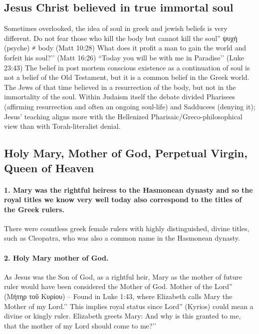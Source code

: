 \subsection{Jesus Christ believed in true immortal soul}\label{subsec:jesus-christ-believed-in-true-immortal-soul}
Sometimes overlooked, the idea of soul in greek and jewish beliefs is very different.
Do not fear those who kill the body but cannot kill the soul'' ψυχή (psyche) ≠ body (Matt 10:28) What does it profit a man to gain the world and forfeit his soul?’’ (Matt 16:26) ``Today you will be with me in Paradise’’ (Luke 23:43)
The belief in post mortem conscious existence as a continuation of soul is not a belief of the Old Testament, but it is a common belief in the Greek world.
The Jews of that time believed in a resurrection of the body, but not in the immortality of the soul.
Within Judaism itself the debate divided Pharisees (affirming resurrection and often an ongoing soul-life) and Sadducees (denying it); Jesus’ teaching aligns more with the Hellenized Pharisaic/Greco-philosophical view than with Torah-literalist denial.

\subsection{Holy Mary, Mother of God, Perpetual Virgin, Queen of Heaven}\label{subsec:holy-mary-mother-of-god-perpetual-virgin-queen-of-heaven}
\paragraph{1.
Mary was the rightful heiress to the Hasmonean dynasty and so the royal titles we know very well today also correspond to the titles of the Greek rulers.}\label{par:mary-was-the-rightful-heiress-to-the-hasmonean-dynasty-and-so-the-royal-titles-we-know-very-well-today-also-correspond-to-the-titles-of-the-greek-rulers.}
There were countless greek female rulers with highly distinguished, divine titles, such as Cleopatra, who was also a common name in the Hasmonean dynasty.
\paragraph{2.
Holy Mary mother of God.}\label{par:holy-mary-mother-of-god.}
As Jesus was the Son of God, as a rightful heir, Mary as the mother of future ruler would have been considered the Mother of God.
Mother of the Lord'' (Μήτηρ τοῦ Κυρίου) -- Found in Luke 1:43, where Elizabeth calls Mary the Mother of my Lord.’’ This implies royal status since Lord'' (Kyrios) could mean a divine or kingly ruler. Elizabeth greets Mary: And why is this granted to me, that the mother of my Lord should come to me?’’
